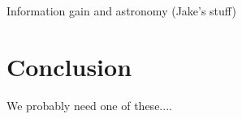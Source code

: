 \documentclass[useAMS,usenatbib,tightenlines,11pt,preprint]{aastex}
\begin{document}




Information gain and astronomy (Jake's stuff)

\section{Conclusion}

We probably need one of these....
\end{document}
